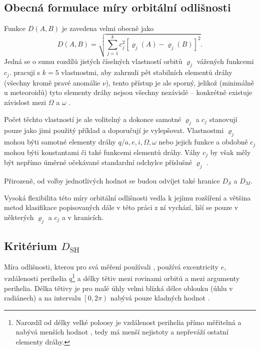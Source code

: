 \subsection{Obecná formulace míry orbitální odlišnosti}%
Funkce $D(A,B)$ je zavedena velmi obecně jako \cite{dsh}
\begin{equation}
    D(A,B)=\sqrt{
    \sum_{j=1}^{k}{c_j^2\left[ \varrho_j(A)-\varrho_j(B) \right]^2}
    }\text{.}
\end{equation}
Jedná se o sumu rozdílů jistých číselných vlastností orbitů $\varrho_j$ vážených funkcemi $c_j$. \citeauthor{dsh} pracují s $k=5$ vlastnostmi, aby zahrnuli pět stabilních elementů dráhy (všechny kromě pravé anomálie $\nu$), tento přístup je ale sporný, jelikož (minimálně u meteoroidů) tyto elementy dráhy nejsou všechny nezávislé -- konkrétně existuje závislost mezi $\Omega$ a $\omega$ \cite{remarks}.

Počet těchto vlastností je ale volitelný a dokonce samotné $\varrho_j$ a $c_j$ \citeauthor{dsh} stanovují pouze jako jimi použitý příklad a doporučují je vylepšovat. Vlastnostmi $\varrho_j$ mohou býti samotné elementy dráhy $q/a,e,i,\Omega,\omega$ nebo jejich funkce a obdobně $c_j$ mohou býti konstantami či také funkcemi elementů dráhy. Váhy $c_j$ by však měly být nepřímo úměrné očekávané standardní odchylce příslušné $\varrho_j$ \cite{dsh}.

Přirozeně, od volby jednotlivých hodnot se budou odvíjet také hranice $D_S$ a $D_M$.

\smallskip

Vysoká flexibilita této míry orbitální odlišnosti vedla k jejímu rozšíření a většina metod klasifikace popisovaných dále v této práci z ní vychází, liší se pouze v některých $\varrho_j$ a $c_j$ a v hranicích.

\subsection{Kritérium $D_\text{SH}$}%
Míra odlišnosti, kterou pro svá měření používali \citeauthor{dsh}, používá excentricity $e$, vzdálenosti perihelia $q$\footnote{Narozdíl od délky velké poloosy je vzdálenost perihelia přímo měřitelná a nabývá menších hodnot \cite{dsh}, tedy má menší nejistoty a nepřeváží ostatní elementy dráhy.} a délky tětiv mezi rovinami orbitů a mezi argumenty perihelia. Délka tětivy je pro malé úhly velmi blízká délce oblouku (úhlu v radiánech) a na intervalu $\left[0,2\pi\right)$ nabývá pouze kladných hodnot \cite{dsh}.

